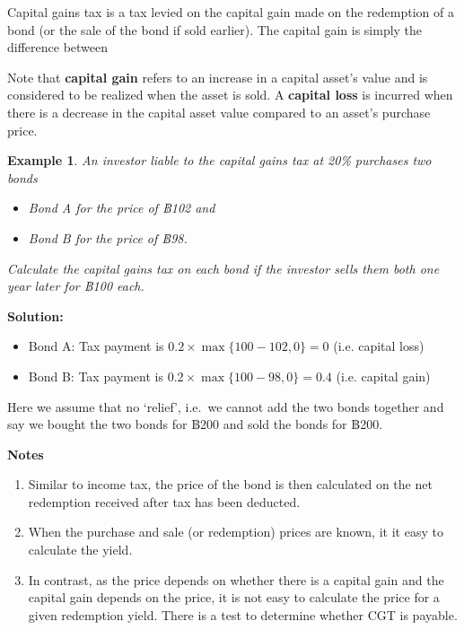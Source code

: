 \documentclass[
]{book}
\theoremstyle{definition}
\theoremstyle{definition}
\newtheorem{example}{Example}[chapter]
\theoremstyle{definition}
\theoremstyle{definition}
\theoremstyle{remark}
\begin{document}
Capital gains tax is a tax levied on the capital gain made on the
redemption of a bond (or the sale of the bond if sold earlier). The
capital gain is simply the difference between

Note that \textbf{capital gain} refers to an increase in a capital asset's
value and is considered to be realized when the asset is sold. A
\textbf{capital loss} is incurred when there is a decrease in the capital
asset value compared to an asset's purchase price.

\begin{example}
\emph{An investor liable to the capital gains tax at 20\% purchases two bonds}

\begin{itemize}
\item
  \emph{Bond A for the price of ฿102 and}
\item
  \emph{Bond B for the price of ฿98.}
\end{itemize}

\emph{Calculate the capital gains tax on each bond if the investor sells them
both one year later for ฿100 each.}
\end{example}

\textbf{Solution:}

\begin{itemize}
\item
  Bond A: Tax payment is \(0.2 \times \max\{100 - 102,0 \} = 0\) (i.e.
  capital loss)
\item
  Bond B: Tax payment is \(0.2 \times \max\{100 - 98,0 \} = 0.4\) (i.e.
  capital gain)
\end{itemize}

Here we assume that no `relief', i.e.~we cannot add the two bonds
together and say we bought the two bonds for ฿200 and sold the bonds for
฿200.

\textbf{Notes}

\begin{enumerate}
\def\labelenumi{\arabic{enumi}.}
\item
  Similar to income tax, the price of the bond is then calculated on
  the net redemption received after tax has been deducted.
\item
  When the purchase and sale (or redemption) prices are known, it it
  easy to calculate the yield.
\item
  In contrast, as the price depends on whether there is a capital gain
  and the capital gain depends on the price, it is not easy to
  calculate the price for a given redemption yield. There is a test to
  determine whether CGT is payable.
\end{enumerate}
\end{document}
